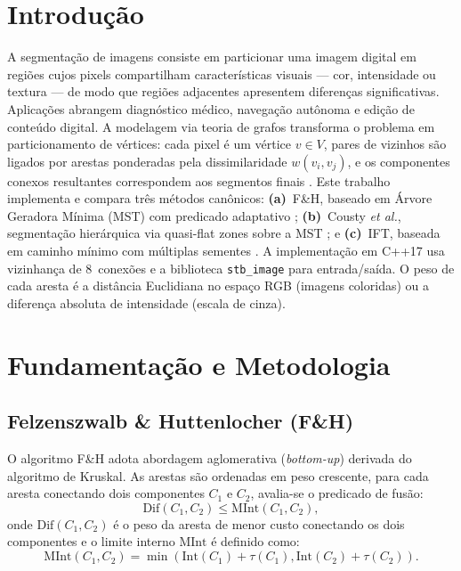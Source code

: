 \documentclass{sbc2023}
\begin{document}
\section{Introdução}
\label{sec:intro}
\vspace*{-8pt}
A segmentação de imagens consiste em particionar uma imagem digital em regiões
cujos pixels compartilham características visuais — cor, intensidade ou textura
— de modo que regiões adjacentes apresentem diferenças significativas. Aplicações
abrangem diagnóstico médico, navegação autônoma e edição de conteúdo digital.
A modelagem via teoria de grafos transforma o problema em particionamento de
vértices: cada pixel é um vértice $v \in V$, pares de vizinhos são ligados por
arestas ponderadas pela dissimilaridade $w(v_i, v_j)$, e os componentes conexos
resultantes correspondem aos segmentos finais \citep{felzenszwalb2004}.
Este trabalho implementa e compara três métodos canônicos:
\textbf{(a)}~F\&H, baseado em Árvore Geradora Mínima (MST) com predicado
adaptativo \citep{felzenszwalb2004};
\textbf{(b)}~Cousty \emph{et al.}, segmentação hierárquica via quasi-flat zones
sobre a MST \citep{cousty2018}; e
\textbf{(c)}~IFT, baseada em caminho mínimo com múltiplas sementes
\citep{falcao2004}.
A implementação em C++17 usa vizinhança de 8~conexões e a biblioteca
\texttt{stb\_image} para entrada/saída. O peso de cada aresta é a distância
Euclidiana no espaço RGB (imagens coloridas) ou a diferença absoluta de
intensidade (escala de cinza).

\section{Fundamentação e Metodologia}
\label{sec:metodo}

\subsection{Felzenszwalb \& Huttenlocher (F\&H)}

O algoritmo F\&H \citep{felzenszwalb2004} adota abordagem aglomerativa
(\emph{bottom-up}) derivada do algoritmo de Kruskal. As arestas são ordenadas
em peso crescente, para cada aresta conectando dois componentes $C_1$ e $C_2$,
avalia-se o predicado de fusão:
\[
  \mathrm{Dif}(C_1, C_2) \leq \mathrm{MInt}(C_1, C_2),
\]
onde $\mathrm{Dif}(C_1, C_2)$ é o peso da aresta de menor custo conectando os dois componentes e o limite interno $\mathrm{MInt}$ é definido como:
\begin{equation}
    \mathrm{MInt}(C_1, C_2) = \min(\mathrm{Int}(C_1) + \tau(C_1), \mathrm{Int}(C_2) + \tau(C_2)).
\end{equation}
\end{document}
